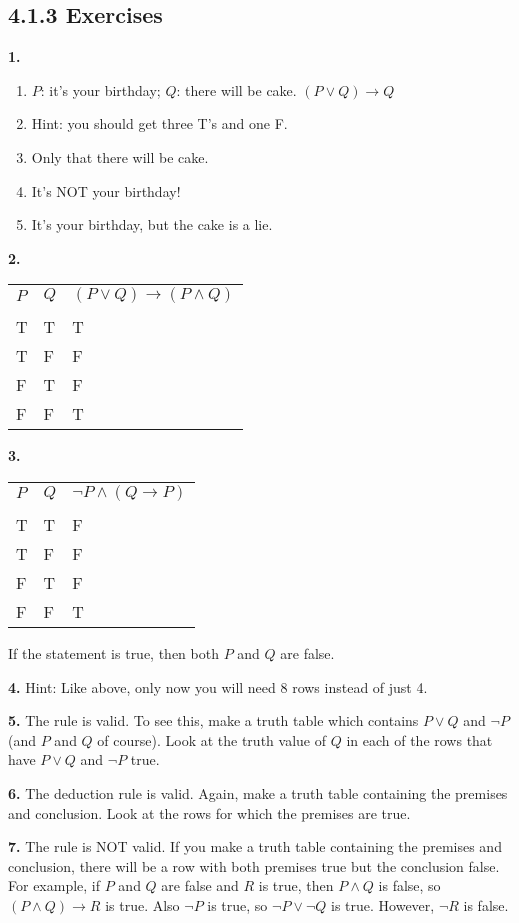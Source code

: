 \documentclass[10pt,]{book}
\theoremstyle{plain}
\theoremstyle{definition}
\theoremstyle{definition}
\theoremstyle{definition}
\numberwithin{equation}{chapter}
\newcommand{\hrulethin}  {\noalign{\hrule height 0.04em}}
\def\imp{\rightarrow}
\begin{document}
\subsection*{4.1.3 Exercises}
\noindent\textbf{1.}\quad{}\leavevmode%
\begin{enumerate}[label=(\alph*)]
\item\hypertarget{li-1050}{}\(P\): it's your birthday; \(Q\): there will be cake. \((P \vee Q) \imp Q\)%
\item\hypertarget{li-1051}{}
                  Hint: you should get three T's and one F.
\item\hypertarget{li-1052}{}
                  Only that there will be cake.
\item\hypertarget{li-1053}{}
                  It's NOT your birthday!
\item\hypertarget{li-1054}{}
                  It's your birthday, but the cake is a lie.
\end{enumerate}
\par\smallskip
\noindent\textbf{2.}\quad{}\begin{tabular}{lll}
\(P\)&\(Q\)&\((P \vee Q) \imp (P \wedge Q)\)\tabularnewline[0pt]
&&\tabularnewline\hrulethin
T&T&T\tabularnewline[0pt]
T&F&F\tabularnewline[0pt]
F&T&F\tabularnewline[0pt]
F&F&T
\end{tabular}
\par\smallskip
\noindent\textbf{3.}\quad{}\begin{tabular}{lll}
\(P\)&\(Q\)&\(\neg P \wedge (Q \imp P)\)\tabularnewline[0pt]
&&\tabularnewline\hrulethin
T&T&F\tabularnewline[0pt]
T&F&F\tabularnewline[0pt]
F&T&F\tabularnewline[0pt]
F&F&T
\end{tabular}

              If the statement is true, then both \(P\) and \(Q\) are false.
\par\smallskip
\noindent\textbf{4.}\quad{}
              Hint: Like above, only now you will need 8 rows instead of just 4.
\par\smallskip
\noindent\textbf{5.}\quad{}
              The rule is valid. To see this, make a truth table which contains \(P \vee Q\) and \(\neg P\) (and \(P\) and \(Q\) of course). Look at the truth value of \(Q\) in each of the rows that have \(P \vee Q\) and \(\neg P\) true.
\par\smallskip
\noindent\textbf{6.}\quad{}
              The deduction rule is valid. Again, make a truth table containing the premises and conclusion. Look at the rows for which the premises are true.
\par\smallskip
\noindent\textbf{7.}\quad{}
              The rule is NOT valid. If you make a truth table containing the premises and conclusion, there will be a row with both premises true but the conclusion false. For example, if \(P\) and \(Q\) are false and \(R\) is true, then \(P \wedge Q\) is false, so \((P \wedge Q) \imp R\) is true. Also \(\neg P\) is true, so \(\neg P \vee \neg Q\) is true. However, \(\neg R\) is false.
\par\smallskip
\end{document}

